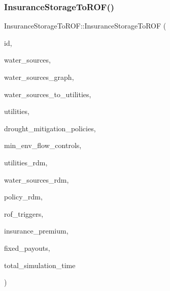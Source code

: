\subsubsection{\texorpdfstring{Insurance\+Storage\+To\+R\+O\+F()}{InsuranceStorageToROF()}\hspace{0.1cm}{\footnotesize\ttfamily [1/2]}}
{\footnotesize\ttfamily Insurance\+Storage\+To\+R\+O\+F\+::\+Insurance\+Storage\+To\+R\+OF (\begin{DoxyParamCaption}\item[{const int}]{id,  }\item[{vector$<$ \mbox{\hyperlink{classWaterSource}{Water\+Source}} $\ast$$>$ \&}]{water\+\_\+sources,  }\item[{const \mbox{\hyperlink{classGraph}{Graph}} \&}]{water\+\_\+sources\+\_\+graph,  }\item[{const vector$<$ vector$<$ int $>$$>$ \&}]{water\+\_\+sources\+\_\+to\+\_\+utilities,  }\item[{vector$<$ \mbox{\hyperlink{classUtility}{Utility}} $\ast$$>$ \&}]{utilities,  }\item[{vector$<$ \mbox{\hyperlink{classDroughtMitigationPolicy}{Drought\+Mitigation\+Policy}} $\ast$$>$ \&}]{drought\+\_\+mitigation\+\_\+policies,  }\item[{vector$<$ \mbox{\hyperlink{classMinEnvFlowControl}{Min\+Env\+Flow\+Control}} $\ast$$>$}]{min\+\_\+env\+\_\+flow\+\_\+controls,  }\item[{vector$<$ vector$<$ double $>$$>$ \&}]{utilities\+\_\+rdm,  }\item[{vector$<$ vector$<$ double $>$$>$ \&}]{water\+\_\+sources\+\_\+rdm,  }\item[{vector$<$ vector$<$ double $>$$>$ \&}]{policy\+\_\+rdm,  }\item[{vector$<$ double $>$ \&}]{rof\+\_\+triggers,  }\item[{const double}]{insurance\+\_\+premium,  }\item[{const vector$<$ double $>$ \&}]{fixed\+\_\+payouts,  }\item[{unsigned long}]{total\+\_\+simulation\+\_\+time }\end{DoxyParamCaption})}

\mbox{\label{classInsuranceStorageToROF_a5229c6bbb6da8268017c71bacec70f67}} 
